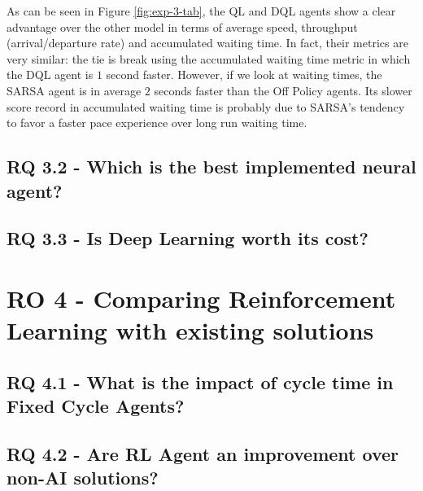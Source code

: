 As can be seen in Figure \ref{fig:exp-3-tab}, the QL and DQL agents show a clear advantage over the other model in terms of average speed, throughput (arrival/departure rate) and accumulated waiting time.
In fact, their metrics are very similar: the tie is break using the accumulated waiting time metric in which the DQL agent is $1$ second faster.
However, if we look at waiting times, the SARSA agent is in average $2$ seconds faster than the Off Policy agents.
Its slower score record in accumulated waiting time is probably due to SARSA's tendency to favor a faster pace experience over long run waiting time.


\subsection{RQ 3.2 - Which is the best implemented neural agent?}


\subsection{RQ 3.3 - Is Deep Learning worth its cost?}


\section{RO 4 - Comparing Reinforcement Learning with existing solutions}

\subsection{RQ 4.1 - What is the impact of cycle time in Fixed Cycle Agents?}


\subsection{RQ 4.2 - Are RL Agent an improvement over non-AI solutions?}

%

